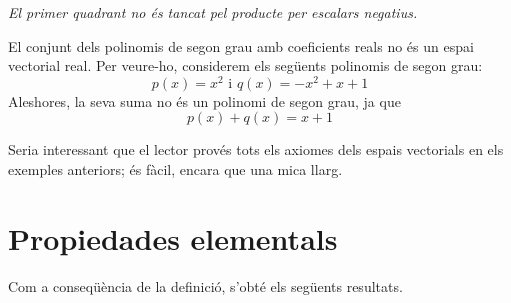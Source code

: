 \begin{center}
%

{\small\itshape El primer quadrant no és tancat pel producte per escalars negatius.}
\end{center}

\begin{exemple}
El conjunt dels polinomis de segon grau amb coeficients reals no és
un espai vectorial real. Per veure-ho, considerem els següents
polinomis de segon grau:%
\begin{equation*}
p(x)=x^{2}\text{ \ \ i \ \ }q(x)=-x^{2}+x+1
\end{equation*}%
Aleshores, la seva suma no és un polinomi de segon grau, ja que%
\begin{equation*}
p(x)+q(x)=x+1
\end{equation*}
\end{exemple}

\begin{observacio}
Seria interessant que el lector provés tots els axiomes dels
espais vectorials en els exemples anteriors; és fàcil, encara que una mica
llarg.
\end{observacio}

\section{Propiedades elementals}

Com a conseqüència de la definició, s’obté els següents
resultats.


